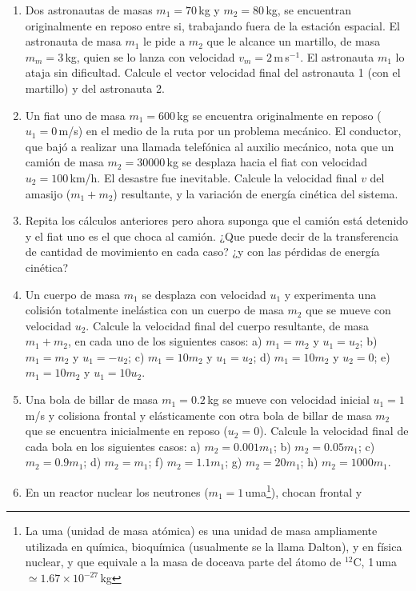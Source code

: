 \documentclass[a4paper,12pt]{article}
\begin{document}
\begin{enumerate}
\begin{minipage}[]{0.295\textwidth}
		\end{minipage}
	\item Dos astronautas de masas $m_1=70$\,kg y $m_2=80$\,kg, se encuentran
		originalmente en reposo entre si, trabajando fuera de la estación
		espacial. El astronauta de masa $m_1$ le pide a $m_2$ que le alcance un
		martillo, de masa $m_m=3$\,kg, quien se lo lanza con velocidad
		$v_m=2$\,m\,s$^{-1}$. El astronauta $m_1$ lo ataja sin dificultad.
		Calcule el vector velocidad final del astronauta 1 (con el martillo) y
		del astronauta 2.
	\item Un fiat uno de masa $m_1=600$\,kg se encuentra originalmente en
		reposo ($u_1=0$\,m/s) en el medio de la ruta por un problema mecánico.
		El conductor, que bajó a realizar una llamada telefónica al auxilio
		mecánico, nota que un camión de masa $m_2=30000$\,kg se desplaza hacia
		el fiat con velocidad $u_2=100$\,km/h. El desastre fue inevitable.
		Calcule la velocidad final $v$ del amasijo ($m_1+m_2$) resultante, y la
		variación de energía cinética del sistema.
	\item Repita los cálculos anteriores pero ahora suponga que el camión está
		detenido y el fiat uno es el que choca al camión. ¿Que puede decir de
		la transferencia de cantidad de movimiento en cada caso? ¿y con las
		pérdidas de energía cinética?  
	\item Un cuerpo de masa $m_1$ se desplaza con velocidad $u_1$ y experimenta
		una colisión totalmente inelástica con un cuerpo de masa $m_2$ que se
		mueve con velocidad $u_2$. Calcule la velocidad final del cuerpo
		resultante, de masa $m_1+m_2$, en cada uno de los siguientes casos: a)
		$m_1=m_2$ y $u_1=u_2$; b) $m_1=m_2$ y $u_1=-u_2$; c) $m_1=10 m_2$ y
		$u_1=u_2$; d) $m_1=10 m_2$ y $u_2=0$; e) $m_1=10 m_2$ y $u_1=10 u_2$.
	\item Una bola de billar de masa $m_1=0.2$\,kg se mueve con velocidad
		inicial $u_1=1$\,m/s y colisiona frontal y elásticamente con otra bola
		de billar de masa $m_2$ que se encuentra inicialmente en reposo
		($u_2=0$). Calcule la velocidad final de cada bola en los siguientes
		casos: a) $m_2=0.001 m_1$; b) $m_2=0.05 m_1$;  c) $m_2=0.9 m_1$; d)
		$m_2=m_1$; f) $m_2=1.1 m_1$; g) $m_2=20 m_1$; h) $m_2=1000 m_1$.
	\item En un reactor nuclear los neutrones ($m_1=1$\,uma\footnote{La uma
		(unidad de masa atómica) es una unidad de masa ampliamente utilizada en
		química, bioquímica (usualmente se la llama Dalton), y en física
		nuclear, y que equivale a la masa de doceava parte del átomo de
		$^{12}$C, 1\,uma$\simeq 1.67 \times 10^{-27}$\,kg}), chocan frontal y

\end{enumerate}
\end{document}
